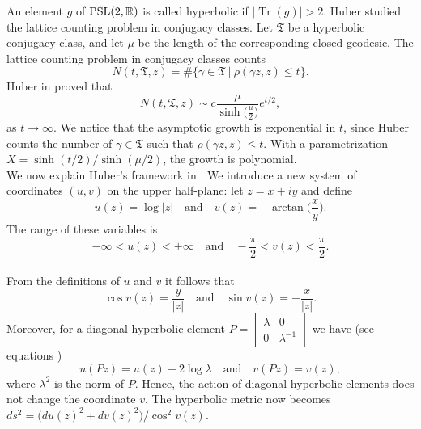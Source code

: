 \documentclass[a4paper,11pt]{amsart}
\theoremstyle{definition}
\DeclareMathOperator{\Tr}{Tr}
\begin{document}
An element $g$ of ${\rm PSL}(2,\mathbb{R})$ is called hyperbolic if $|\Tr(g)|>2$.
Huber studied the lattice counting problem in conjugacy classes. Let $\mathfrak{T}$ be a hyperbolic conjugacy class, and
let $\mu$ be the length of the corresponding closed geodesic.
The lattice counting problem in conjugacy classes counts
\begin{equation}\label{NT}
N(t,\mathfrak{T},z)=\# \Big\{\gamma \in \mathfrak{T} \: | \: \rho(\gamma z ,z) \leq t \Big\}.
\end{equation}
Huber in \cite[Satz B]{HuHel} proved that
$$N(t,\mathfrak{T},z) \sim c\frac{\mu}{\sinh\big(\frac{\mu}{2}\big)}e^{t/2},$$
as $t \to \infty$.
We notice that the asymptotic growth is exponential in $t$, since Huber counts the number of $\gamma \in \mathfrak{T}$ such that $\rho(\gamma z ,z) \leq t$. With a parametrization $X=\sinh(t/2)/\sinh(\mu/2)$, the growth is polynomial.\\
We now explain Huber's framework in \cite{Hu98}. We introduce a new system of coordinates $(u,v)$ on the upper half-plane: 
let $z=x+iy$ and define \begin{equation}\label{uv}
u(z)=\log|z| \quad  \text{and} \quad  v(z)=-\arctan\Big(\frac{x}{y}\Big)  .\end{equation} 
The range of  these variables is $$-\infty<u(z)<+\infty \quad \text{and} \quad -\frac{\pi}{2}<v(z)<\frac{\pi}{2} . $$
\\
From the definitions of $u$ and $v$ it follows that $$\cos v(z)=\frac{y}{|z|} \quad \text{and} \quad \sin v(z)= -\frac{x}{|z|}.$$
Moreover, for a diagonal hyperbolic element $P= \begin{bmatrix}
\lambda & 0 \\
0 & \lambda^{-1}
\end{bmatrix}$ we have (see equations \cite[p. 19, Eq.23]{Hu98}) 
$$ u(Pz)=u(z)+2\log\lambda \quad \text{and} \quad v(Pz)=v(z),$$
where $\lambda^2$ is the norm of $P$. Hence, the action of diagonal hyperbolic elements does not change the coordinate $v$.  
The hyperbolic metric now becomes $ds^2=\big(du(z)^2+dv(z)^2\big)\big/\cos^2v(z)$.
\end{document}
